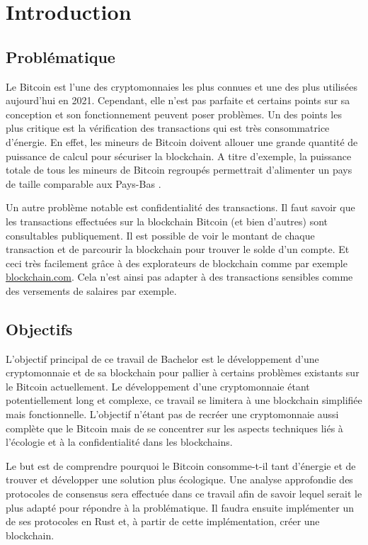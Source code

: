 \chapter{Introduction}
\label{ch:intro}

\section{Problématique}

Le Bitcoin est l'une des cryptomonnaies les plus connues et une des plus utilisées aujourd'hui en 2021. Cependant, elle n'est pas parfaite et certains points sur sa conception et son fonctionnement peuvent poser problèmes. Un des points les plus critique est la vérification des transactions qui est très consommatrice d'énergie. En effet, les mineurs de Bitcoin doivent allouer une grande quantité de puissance de calcul pour sécuriser la blockchain. A titre d'exemple, la puissance totale de tous les mineurs de Bitcoin regroupés permettrait d'alimenter un pays de taille comparable aux Pays-Bas \cite{BTC_cons}. 

Un autre problème notable est confidentialité des transactions. Il faut savoir que les transactions effectuées sur la blockchain Bitcoin (et bien d'autres) sont consultables publiquement. Il est possible de voir le montant de chaque transaction et de parcourir la blockchain pour trouver le solde d'un compte. Et ceci très facilement grâce à des explorateurs de blockchain comme par exemple \url{blockchain.com}. Cela n'est ainsi pas adapter à des transactions sensibles comme des versements de salaires par exemple.

\section{Objectifs}

L'objectif principal de ce travail de Bachelor est le développement d'une cryptomonnaie et de sa blockchain pour pallier à certains problèmes existants sur le Bitcoin actuellement. Le développement d'une cryptomonnaie étant potentiellement long et complexe, ce travail se limitera à une blockchain simplifiée mais fonctionnelle. L'objectif n'étant pas de recréer une cryptomonnaie aussi complète que le Bitcoin mais de se concentrer sur les aspects techniques liés à l'écologie et à la confidentialité dans les blockchains.

Le but est de comprendre pourquoi le Bitcoin consomme-t-il tant d'énergie et de trouver et développer une solution plus écologique. Une analyse approfondie des protocoles de consensus sera effectuée dans ce travail afin de savoir lequel serait le plus adapté pour répondre à la problématique. Il faudra ensuite implémenter un de ses protocoles en Rust et, à partir de cette implémentation, créer une blockchain.

